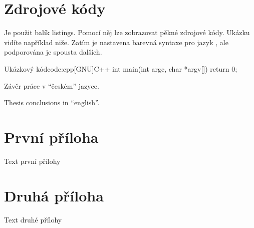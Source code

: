 \documentclass[a4paper,12pt]{article}
\begin{document}
\section{Zdrojové kódy}
Je použit balík listings. Pomocí něj lze zobrazovat pěkné zdrojové kódy. Ukázku vidíte například niže. Zatím je nastavena barevná syntaxe pro jazyk \cpp, ale podporována je spousta dalších. 

\begin{upcode}{Ukázkový \cpp kód}{code:cpp}{[GNU]C++}
int main(int argc, char *argv[]) {
	return 0;
}
\end{upcode}

\begin{upconclusions}[czech]
Závěr práce v \enquote{českém} jazyce.
\end{upconclusions}

\begin{upconclusions}[english]
Thesis conclusions in \enquote{english}.
\end{upconclusions}

\upprintbibliography

\upappendix
\section{První příloha}
Text první přílohy

\section{Druhá příloha}
Text druhé přílohy

\upprintindex
\end{document}

